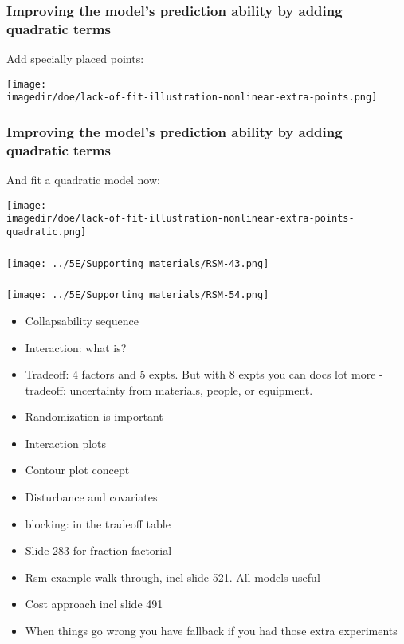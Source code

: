 \documentclass[handout,11pt,aspectratio=169,mathserif]{beamer}
\begin{document}
\begin{frame}\frametitle{Improving the model's prediction ability by adding quadratic terms}
	Add specially placed points:
	
	\centerline{\texttt{[image: \\imagedir/doe/lack-of-fit-illustration-nonlinear-extra-points.png]}}
\end{frame}

\begin{frame}\frametitle{Improving the model's prediction ability by adding quadratic terms}
	And fit a quadratic model now:
	
	\centerline{\texttt{[image: \\imagedir/doe/lack-of-fit-illustration-nonlinear-extra-points-quadratic.png]}}
\end{frame}

\begin{frame}\frametitle{}
	\centerline{\texttt{[image: ../5E/Supporting materials/RSM-43.png]}}
\end{frame}
\begin{frame}\frametitle{}
	\centerline{\texttt{[image: ../5E/Supporting materials/RSM-54.png]}}
\end{frame}



\begin{itemize}
	
	\item   Collapsability sequence
	\item 	Interaction: what is?
	\item 	Tradeoff: 4 factors and 5 expts. But with 8 expts you can docs lot more
	  - tradeoff: uncertainty from materials, people, or equipment.
	\item 	Randomization is important
	\item 	Interaction plots
	\item 	Contour plot concept
	\item 	Disturbance and covariates
	\item   blocking: in the tradeoff table
	\item 	Slide 283 for fraction factorial
	\item 	Rsm example walk through, incl slide 521. All models useful
	\item 	Cost approach incl slide 491
	\item 	When things go wrong you have fallback if you had those extra experiments

	


\end{itemize}
\end{document}
